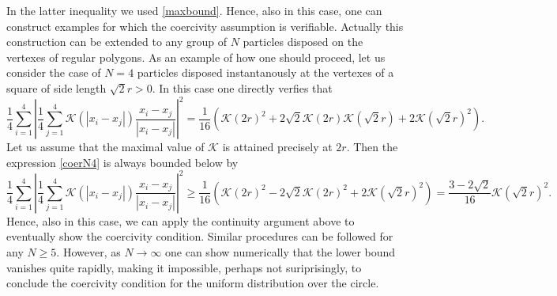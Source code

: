 In the latter inequality we used \eqref{maxbound}. Hence, also in this case, one can construct examples for which the coercivity assumption is verifiable. Actually this construction can be extended to any group of $N$ particles disposed on the vertexes of regular polygons. As an example of how one should proceed, let us consider the case of $N=4$ particles disposed instantanously at the vertexes of a square of side length $\sqrt{2} r>0$. In this case one directly verfies that
\begin{equation}\label{coerN4}
\frac{1}{4} \sum_{i=1}^4 \left | \frac{1}{4} \sum_{j=1}^4 \mathcal K(|x_i-x_j|) \frac{x_i-x_j}{|x_i-x_j|} \right |^2 = \frac{1}{16} ( \mathcal K(2 r)^2 + 2 \sqrt{2} \mathcal K(2 r) \mathcal K(\sqrt 2 r) + 2 \mathcal K(\sqrt 2 r)^2 ).
\end{equation}
Let us assume that the maximal value of $\mathcal K$ is attained precisely at $2 r$. Then the expression \eqref{coerN4} is always bounded below by
$$
\frac{1}{4} \sum_{i=1}^4 \left | \frac{1}{4} \sum_{j=1}^4 \mathcal K(|x_i-x_j|) \frac{x_i-x_j}{|x_i-x_j|} \right |^2  \geq \frac{1}{16} ( \mathcal K(2 r)^2 - 2 \sqrt{2} \mathcal K(2 r)^2 + 2 \mathcal K(\sqrt 2 r)^2 ) = \frac{3 -2 \sqrt 2}{16} \mathcal K(\sqrt 2 r)^2.
$$
Hence, also in this case, we can apply the continuity argument above to eventually show the coercivity condition. Similar procedures can be followed for any $N \geq 5$. However, as $N \to \infty$ one can show numerically that the lower bound vanishes quite rapidly, making it impossible, perhaps not suriprisingly, to conclude the coercivity condition for the uniform distribution over the circle.
\\

